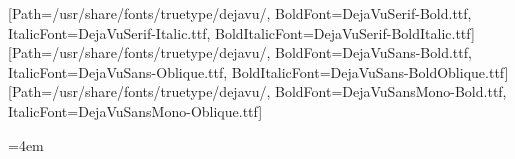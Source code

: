 
\usepackage[a4paper,margin=22mm]{geometry}
\usepackage{fontspec}
\setmainfont{DejaVuSerif.ttf}[Path=/usr/share/fonts/truetype/dejavu/, BoldFont=DejaVuSerif-Bold.ttf, ItalicFont=DejaVuSerif-Italic.ttf, BoldItalicFont=DejaVuSerif-BoldItalic.ttf]
\setsansfont{DejaVuSans.ttf}[Path=/usr/share/fonts/truetype/dejavu/, BoldFont=DejaVuSans-Bold.ttf, ItalicFont=DejaVuSans-Oblique.ttf, BoldItalicFont=DejaVuSans-BoldOblique.ttf]
\setmonofont{DejaVuSansMono.ttf}[Path=/usr/share/fonts/truetype/dejavu/, BoldFont=DejaVuSansMono-Bold.ttf, ItalicFont=DejaVuSansMono-Oblique.ttf]
\usepackage{amsmath,amssymb,mathtools,bm}
\usepackage{booktabs,longtable,array,tabularx}
\usepackage{enumitem}
\usepackage{xcolor}
\usepackage{listings}
\usepackage{fancyvrb}
\usepackage{titlesec}
\titleformat{\section}{\Large\bfseries}{\thesection}{0.7em}{}
\titleformat{\subsection}{\large\bfseries}{\thesubsection}{0.6em}{}
\setlength{\parskip}{0.45em}
\setlength{\parindent}{0pt}
\emergencystretch=4em
\sloppy
\newcommand{\R}{\mathbb{R}}
\newcommand{\SO}{\mathrm{SO}}
\newcommand{\SE}{\mathrm{SE}}
\newcommand{\Exp}{\mathrm{Exp}}
\newcommand{\Log}{\mathrm{Log}}
\newcommand{\Ad}{\mathrm{Ad}}
\newcommand{\diag}{\mathrm{diag}}
\newcommand{\calN}{\mathcal{N}}
\newcommand{\T}{^{\mathsf T}}
\newcommand{\dt}{\Delta t}
\newcommand{\bbm}[1]{\begin{bmatrix}#1\end{bmatrix}}
\renewcommand{\skew}[1]{[#1]_{\times}}
\newcommand{\qprod}{\otimes}
\newcommand{\vect}[1]{\bm{#1}}
\newcommand{\norm}[1]{\left\lVert #1\right\rVert}
\newcommand{\sourceblock}[1]{\begin{quote}\small\sffamily Джерельний блок: #1\end{quote}}
\newcommand{\important}[1]{\textbf{#1}}
